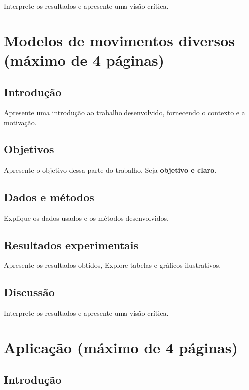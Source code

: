 \documentclass{article}
\begin{document}
Interprete os resultados e apresente uma visão crítica.

\newpage

\section{Modelos de movimentos diversos (máximo de 4 páginas)}

\subsection{Introdução}

Apresente uma introdução ao trabalho desenvolvido, fornecendo o contexto e a motivação.

\subsection{Objetivos}

Apresente o objetivo dessa parte do trabalho. Seja {\bf objetivo e claro}.

\subsection{Dados e métodos}

Explique os dados usados e os métodos desenvolvidos.

\subsection{Resultados experimentais}

Apresente os resultados obtidos, Explore tabelas e gráficos ilustrativos.

\subsection{Discussão}

Interprete os resultados e apresente uma visão crítica.

\newpage

\section{Aplicação (máximo de 4 páginas)}

\subsection{Introdução}
\end{document}
